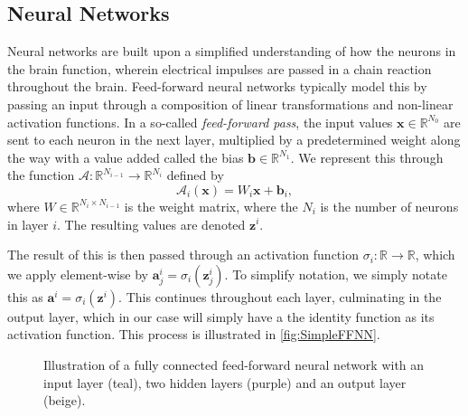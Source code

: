 \subsection{Neural Networks}
Neural networks are built upon a simplified understanding of how the neurons in the brain function, wherein electrical impulses are passed in a chain reaction throughout the brain.
Feed-forward neural networks typically model this by passing an input through a composition of linear transformations and non-linear activation functions.
In a so-called \textit{feed-forward pass}, the input values $\boldsymbol{x} \in \mathbb{R}^{N_0}$ are sent to each neuron in the next layer, multiplied by a predetermined weight along the way with a value added called the bias $\boldsymbol{b} \in \mathbb{R}^{N_1}$.
We represent this through the function $\mathcal{A} : \mathbb{R}^{N_{i-1}} \to \mathbb{R}^{N_{i}}$ defined by
\begin{equation}\label{eq:A_func}
    \mathcal{A}_i(\boldsymbol{x}) = W_i \boldsymbol{x} + \boldsymbol{b}_i,
\end{equation}
where $W \in \mathbb{R}^{N_i \times N_{i-1}}$ is the weight matrix, where the $N_i$ is the number of neurons in layer $i$.
The resulting values are denoted $\boldsymbol{z}^i$.

The result of this is then passed through an activation function $\sigma_i : \mathbb{R} \to \mathbb{R}$, which we apply element-wise by $\boldsymbol{a}^i_j = \sigma_i (\boldsymbol{z}^i_j)$.
To simplify notation, we simply notate this as $\boldsymbol{a}^i = \sigma_i(\boldsymbol{z}^i)$.
This continues throughout each layer, culminating in the output layer, which in our case will simply have a the identity function as its activation function.
This process is illustrated in \autoref{fig:SimpleFFNN}.

\begin{figure}[h]
\centering

\caption{Illustration of a fully connected feed-forward neural network with an input layer (teal), two hidden layers (purple) and an output layer (beige).}
\label{fig:SimpleFFNN}
\end{figure}

